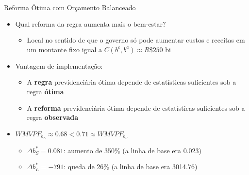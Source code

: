 \begin{frame}[label=optimal]{Reforma Ótima com Orçamento Balanceado}
    \begin{itemize}
        \item Qual reforma da regra aumenta mais o bem-estar?
        \begin{itemize}
            \item Local no sentido de que o governo só pode aumentar custos e receitas em um montante fixo igual a $C(b^c,b^a)\approx R\$250$ bi
        \end{itemize}
        \item Vantagem de implementação:
        \begin{itemize}
            \item A \textbf{regra} previdenciária ótima depende de estatísticas suficientes sob a regra \textbf{ótima}
            \item A \textbf{reforma} previdenciária ótima depende de estatísticas suficientes sob a regra \textbf{observada}
        \end{itemize}
        \item $WMVPF_{b_L} \approx 0.68<0.71\approx WMVPF_{b_S}$
        \begin{itemize}
            \item $\Delta b_S^*=0.081$: aumento de 350\% (a linha de base era 0.023)
            \item $\Delta b_L^*=-791$: queda de 26\% (a linha de base era 3014.76)
        \end{itemize}
    \end{itemize}
\end{frame}

